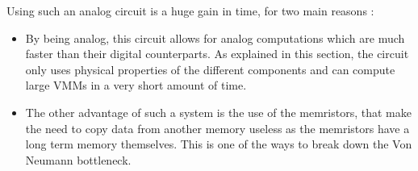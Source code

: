 Using such an analog circuit is a huge gain in time, for two main reasons :

\begin{itemize}
  \item By being analog, this circuit allows for analog computations which are much faster than their digital counterparts. As explained in this section, the circuit only uses physical properties of the different components and can compute large \acp{VMM} in a very short amount of time.
  \item The other advantage of such a system is the use of the memristors, that make the need to copy data from another memory useless as the memristors have a long term memory themselves. This is one of the ways to break down the Von Neumann bottleneck.
\end{itemize}
